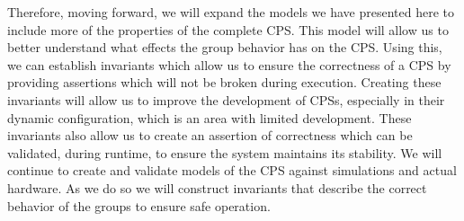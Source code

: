 Therefore, moving forward, we will expand the models we have presented here to include more of the properties of the complete CPS.
This model will allow us to better understand what effects the group behavior has on the CPS.
Using this, we can establish invariants which allow us to ensure the correctness of a CPS by providing assertions which will not be broken during execution.
Creating these invariants will allow us to improve the development of CPSs, especially in their dynamic configuration, which is an area with limited development.
These invariants also allow us to create an assertion of correctness which can be validated, during runtime, to ensure the system maintains its stability.
We will continue to create and validate models of the CPS against simulations and actual hardware.
As we do so we will construct invariants that describe the correct behavior of the groups to ensure safe operation. 
